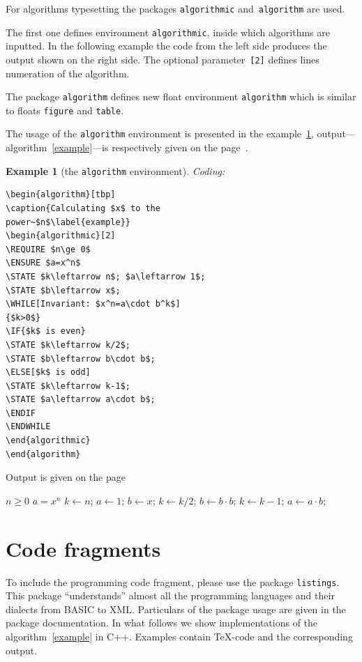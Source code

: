 \documentclass[a4paper,conference]{IEEEtran}
\newtheorem{example}[remark]{Example}
\begin{document}
For algorithms typesetting the packages \verb|algorithmic| and~\verb|algorithm| are used. 

The first one defines environment \verb|algorithmic|, inside which algorithms are inputted. In the following example the code from the left side produces the output shown on the right side. The optional parameter~\verb|[2]| defines lines numeration of the algorithm.

The  package \verb|algorithm| defines new float environment \verb|algorithm| which is  similar to floats \verb|figure| and \verb|table|. 

The usage of the \verb|algorithm| environment is presented in the example~\ref{algorytm}, output---algorithm~\ref{example}---is respectively given on the page~\pageref{example}.


\begin{example}[the \texttt{algorithm} environment]\label{algorytm}
Coding:\begin{verbatim}\begin{algorithm}[tbp]
\caption{Calculating $x$ to the 
power~$n$\label{example}}
\begin{algorithmic}[2]
\REQUIRE $n\ge 0$
\ENSURE $a=x^n$
\STATE $k\leftarrow n$; $a\leftarrow 1$; 
\STATE $b\leftarrow x$;
\WHILE[Invariant: $x^n=a\cdot b^k$]
{$k>0$}
\IF{$k$ is even}
\STATE $k\leftarrow k/2$;
\STATE $b\leftarrow b\cdot b$;
\ELSE[$k$ is odd]
\STATE $k\leftarrow k-1$;
\STATE $a\leftarrow a\cdot b$;
\ENDIF
\ENDWHILE
\end{algorithmic}
\end{algorithm}
\end{verbatim}
\end{example}

Output is given on the page~\pageref{example}
\begin{algorithm}[tbp]
\caption{Calculating $x$ to the 
power~$n$\label{example}}
\begin{algorithmic}[2]
\REQUIRE $n\ge 0$
\ENSURE $a=x^n$
\STATE $k\leftarrow n$; $a\leftarrow 1$; 
\STATE $b\leftarrow x$;
\STATE $k\leftarrow k/2$;
\STATE $b\leftarrow b\cdot b$;
\ELSE[$k$ is odd]
\STATE $k\leftarrow k-1$;
\STATE $a\leftarrow a\cdot b$;
\ENDIF
\ENDWHILE
\end{algorithmic}
\end{algorithm}


\section{Code fragments}
To include the programming code fragment, please use the package \verb|listings|. This package ``understands'' almost all the programming languages and their dialects from BASIC to XML. Particulars of the package usage are given in the package documentation. In what follows we show implementations of the algorithm~\ref{example} in C++. Examples contain \TeX-code and the corresponding output.
\end{document}
